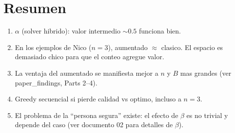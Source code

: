 \documentclass[11pt]{article}
\begin{document}
\section{Resumen}

\begin{enumerate}
  \item $\alpha$ (solver hibrido): valor intermedio $\sim 0.5$ funciona bien.
  \item En los ejemplos de Nico ($n=3$), aumentado $\approx$ clasico.
        El espacio es demasiado chico para que el conteo agregue valor.
  \item La ventaja del aumentado se manifiesta mejor a $n$ y $B$ mas grandes
        (ver paper\_findings, Parts 2--4).
  \item Greedy secuencial si pierde calidad vs optimo, incluso a $n=3$.
  \item El problema de la ``persona segura'' existe: el efecto de $\beta$
        es no trivial y depende del caso (ver documento 02 para detalles de $\beta$).
\end{enumerate}
\end{document}
